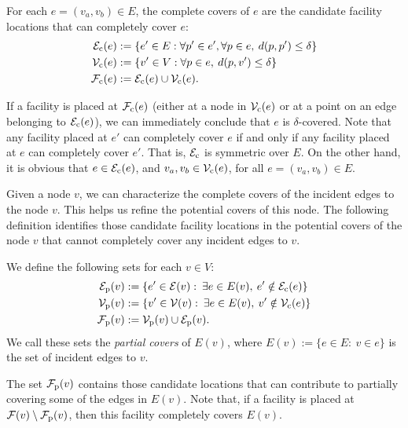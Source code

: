 \begin{definition}
\label{def.linksetse}
For each $e=(v_{a}, v_{b}) \in E$, the  complete covers of $e$ are the candidate facility locations that can completely cover $e$:
\begin{align}
{\mathcal E}_{\mathrm{c}}(e)& :=\{e' \in E:   \forall p' \in e', \forall  p \in e,\:   d(p,p') \le \delta\}\nonumber\\
   \mathcal V_{\mathrm{c}}(e)&:= \{v' \in V:   \forall  p \in e,\: d(p,v') \le \delta \}\nonumber\\
  \mathcal F_{\mathrm{c}}(e) &:= {\mathcal E}_{\mathrm{c}}(e) \cup \mathcal V_{\mathrm{c}}(e).
\end{align}
\end{definition}
If a facility is placed at $\mathcal F_{\mathrm{c}}(e)$ (either at a node in $\mathcal V_{\mathrm{c}}(e)$ or at a point on an edge belonging to ${\mathcal E}_{\mathrm{c}}(e)$), we can immediately conclude that $e$ is $\delta$-covered.
Note that any facility placed at $e'$ can completely cover $e$ if and only if any facility placed at $e$ can completely cover $e'$. That is,  ${\mathcal E}_{\mathrm{c}}$ is symmetric over $E$. On the other hand, it is obvious that $e\in {\mathcal E}_{\mathrm{c}}(e)$,  and $v_{a} ,v_{b}\in \mathcal V_{\mathrm{c}}(e)$, for all $e=(v_a,v_b)\in E$.


Given a node $v$, we can characterize the complete covers of the incident edges to the node $v$. This helps us refine the potential covers of this node.  The following definition  identifies those candidate facility locations in the potential covers of the node $v$ that cannot completely cover any incident edges to $v$.
\begin{definition} \label{defa.linksetsvincident}
We define the following sets for each $v\in V$:
\begin{align}
{\mathcal E}_{\mathrm{p}}(v)&:=\{e'\in {\mathcal E}(v):\: \exists e\in E(v),\: e'\notin{\mathcal E}_{\mathrm{c}}(e)\} \nonumber\\  \mathcal V_{\mathrm{p}}(v)&:=\{v'\in \mathcal V(v):\: \exists e\in E(v),\: v'\notin\mathcal V_{\mathrm{c}}(e)\}   \nonumber\\
\mathcal F_{\mathrm{p}}(v)&:=\mathcal V_{\mathrm{p}}(v)\cup{\mathcal E}_{\mathrm{p}}(v).
\end{align}
We call these sets the \emph{partial covers} of $E(v)$, where $E(v):=\{e\in E:\: v\in e\}$ is the set of incident edges to $v$.
\end{definition}
The set $\mathcal F_{\mathrm{p}}(v)$ contains those candidate locations that can contribute to partially covering some of the edges in $E(v)$. Note that, if a facility is placed at $\mathcal F(v)\setminus \mathcal F_{\mathrm{p}}(v)$, then this facility completely covers  $E(v)$.

